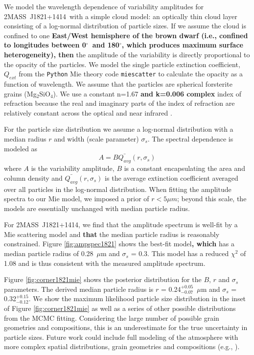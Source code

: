 \documentclass[twocolumn]{aastex6}
\newcommand{\degree}{$^\circ$}
\newcommand{\sha}{2MASS~J0835$-$0819}
\newcommand{\shb}{2MASS~J1821+1414}
\begin{document}
We model the wavelength dependence of variability amplitudes for \shb\ with a simple cloud model: an optically thin cloud layer consisting of a log-normal distribution of particle sizes.
If we assume the cloud is confined to one \textbf{East/West hemisphere of the brown dwarf (i.e., confined to longitudes between 0\degree\ and 180\degree, which produces maximum surface heterogeneity), then} the amplitude of the variability is directly proportional to the opacity of the particles.
We model the single particle extinction coefficient, $Q_{ext}$ from the \texttt{Python} Mie theory code \texttt{miescatter} \citep{bohren1983mie} to calculate the opacity as a function of wavelength.
We assume that the particles are spherical forsterite grains (Mg$_2$SiO$_4$).
We use a constant n=1.67 \textbf{and k=0.006 complex} index of refraction because the real and imaginary parts of the index of refraction are relatively constant across the optical and near infrared \citep{scott1996forsterite}.


For the particle size distribution we assume a log-normal distribution with a median radius $r$ and width (scale parameter) $\sigma_s$.
The spectral dependence is modeled as 
\begin{equation}
A = B \bar{Q_{avg}}(r,\sigma_s)
\end{equation}
where $A$ is the variability amplitude, $B$ is a constant encapsulating the area and column density and $\bar{Q_{avg}}(r,\sigma_s)$ is the average extinction coefficient averaged over all particles in the log-normal distribution.
When fitting the amplitude spectra to our Mie model, we imposed a prior of $r < 5 \mu m$; beyond this scale, the models are essentially unchanged with median particle radius.

For \shb, we find that the amplitude spectrum is well-fit by a Mie scattering model and \textbf{that} the median particle radius is reasonably constrained.
Figure \ref{fig:ampspec1821} shows the best-fit model\textbf{, which} has a median particle radius of 0.28~$\mu$m and $\sigma_s$ = 0.3.
This model has a reduced $\chi^2$ of 1.08 and is thus consistent with the measured amplitude spectrum.

Figure \ref{fig:corner1821mie} shows the posterior distribution for the $B$, $r$ and $\sigma_s$ parameters.
The derived median particle radius is $r$ = 0.24$^{+0.05}_{-0.07}$~$\mu$m 
and $\sigma_s$ = 0.32$^{+0.15}_{-0.12}$.
We show the maximum likelihood particle size distribution in the inset of Figure \ref{fig:corner1821mie} as well as a series of other possible distributions from the MCMC fitting.
Considering the large number of possible grain geometries and compositions, this is an underestimate for the true uncertainty in particle sizes.
Future work could include full modeling of the atmosphere with more complex spatial distributions, grain geometries and compositions (e.g., \citealt{2008ApJ...675L.105H}).
\end{document}
